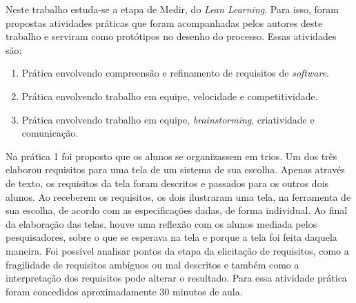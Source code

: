 Neste trabalho estuda-se a etapa de Medir, do \textit{Lean Learning}. Para isso, foram propostas atividades práticas que foram acompanhadas pelos autores deste trabalho e serviram como protótipos no desenho do processo. Essas atividades são: 

    \begin{enumerate}\setlength\itemsep{0.5em}
        \item Prática envolvendo compreensão e refinamento de requisitos de \textit{software}.
        \item Prática envolvendo trabalho em equipe, velocidade e competitividade.
        \item Prática envolvendo trabalho em equipe, \textit{brainstorming}, criatividade e comunicação.
    \end{enumerate}

Na prática 1 foi proposto que os alunos se organizassem em trios. Um dos três elaborou requisitos para uma tela de um sistema de sua escolha. Apenas através de texto, os requisitos da tela foram descritos e passados para os outros dois alunos. Ao receberem os requisitos, os dois ilustraram uma tela, na ferramenta de sua escolha, de acordo com as especificações dadas, de forma individual. Ao final da elaboração das telas, houve uma reflexão com os alunos mediada pelos pesquisadores, sobre o que se esperava na tela e porque a tela foi feita daquela maneira. Foi possível analisar pontos da etapa da elicitação de requisitos, como a fragilidade de requisitos ambíguos ou mal descritos e também como a interpretação dos requisitos pode alterar o resultado. Para essa atividade prática foram concedidos aproximadamente 30 minutos de aula.

